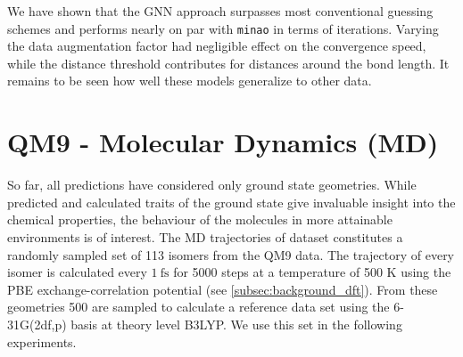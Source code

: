 We have shown that the GNN approach surpasses most conventional guessing schemes and performs nearly on par with \texttt{minao} in terms of iterations. Varying the data augmentation factor had negligible effect on the convergence speed, while the distance threshold contributes for distances around the bond length. It remains to be seen how well these models generalize to other data. 

\section{QM9 -  Molecular Dynamics (MD)}
\label{sec:qm9_md_isomers_benchmark}
So far, all predictions have considered only ground state geometries. While predicted and calculated traits of the ground state give invaluable insight into the chemical properties, the behaviour of the molecules in more attainable environments is of interest. The MD trajectories of  dataset \parencite{ref:qm9_isomers_md} constitutes a randomly sampled set of 113 isomers from the QM9  data. The trajectory of every isomer is calculated every $\SI{1}{\femto\second}$ for 5000 steps at a temperature of 500 K using the PBE exchange-correlation potential (see \ref{subsec:background_dft}). From these geometries 500 are sampled to calculate a reference data set using the 6-31G(2df,p) basis at theory level B3LYP. We use this set in the following experiments. 
\newpage
